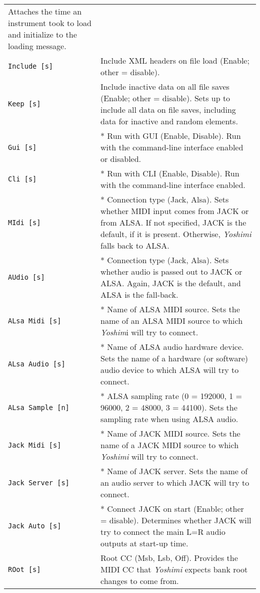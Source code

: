 \begin{center}
\begin{longtable}{p{4cm} p{10cm}}
   Attaches the time an instrument took to load and initialize to the loading
   message. \\
\texttt{Include [s]} &
   Include XML headers on file load (Enable; other = disable). \\
\texttt{Keep [s]} &
   Include inactive data on all file saves (Enable; other = disable).
   Sets up to include all data on file saves, including data for
   inactive and random elements. \\
\texttt{Gui [s]} &
   * Run with GUI (Enable, Disable).
   Run with the command-line interface enabled or disabled.  \\
\texttt{Cli [s]} &
   * Run with CLI (Enable, Disable).
   Run with the command-line interface enabled. \\
\texttt{MIdi [s]} &
   * Connection type (Jack, Alsa).
   Sets whether MIDI input comes from JACK or from ALSA.
   If not specified, JACK is the default, if it is present.  Otherwise,
   \textsl{Yoshimi} falls back to ALSA. \\
\texttt{AUdio [s]} &
   * Connection type (Jack, Alsa).
   Sets whether audio is passed out to JACK or ALSA.  Again, JACK is the
   default, and ALSA is the fall-back.  \\
\texttt{ALsa Midi [s]} &
   * Name of ALSA MIDI source.
   Sets the name of an ALSA MIDI source to which
   \textsl{Yoshim}i will try to connect.  \\
\texttt{ALsa Audio [s]} &
   * Name of ALSA audio hardware device.
   Sets the name of a hardware (or software)
   audio device to which ALSA will try to connect.  \\
\texttt{ALsa Sample [n]} &
   * ALSA sampling rate (0 = 192000, 1 = 96000, 2 = 48000, 3 = 44100).
   Sets the sampling rate when using ALSA audio. \\
\texttt{Jack Midi [s]} &
   * Name of JACK MIDI source.
   Sets the name of a JACK MIDI source to which
   \textsl{Yoshimi} will try to connect.  \\
\texttt{Jack Server [s]} &
   * Name of JACK server.
   Sets the name of an audio server to which JACK will try to connect. \\
\texttt{Jack Auto [s]} &
   * Connect JACK on start (Enable; other = disable).
   Determines whether JACK will try to connect the main L=R audio outputs at
   start-up time. \\
\texttt{ROot [s]} &
   Root CC (Msb, Lsb, Off).
   Provides the MIDI CC that \textsl{Yoshimi} expects bank root changes to come
   from.  \\

\end{longtable}
\end{center}
